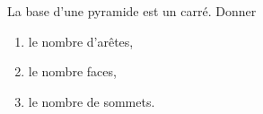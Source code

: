 
\begin{mental}

    La base d'une pyramide est un carré. Donner
    \begin{enumerate}
        \item
            le nombre d'arêtes,
        \item
            le nombre faces,
        \item
            le nombre de sommets.
    \end{enumerate}

\end{mental}
